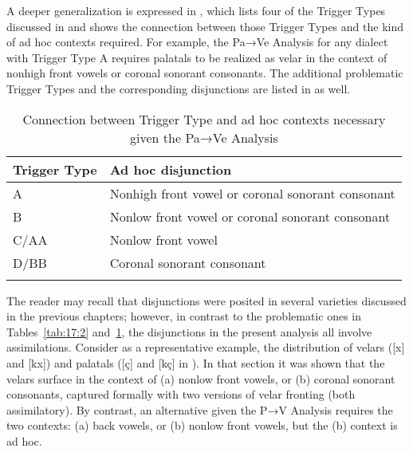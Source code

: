 A deeper generalization is expressed in , which lists four of the Trigger Types discussed in  and shows the connection between those Trigger Types and the kind of ad hoc contexts required. For example, the Pa→Ve Analysis for any dialect with Trigger Type A requires palatals to be realized as velar in the context of nonhigh front vowels or coronal sonorant consonants. The additional problematic Trigger Types and the corresponding disjunctions are listed in  as well.

\begin{table}
\caption{Connection between Trigger Type and ad hoc contexts necessary given the Pa→Ve Analysis\label{tab:17:3}}
\begin{tabular}{ll}
\lsptoprule
Trigger Type & Ad hoc disjunction\\\midrule
A & Nonhigh front vowel or coronal sonorant consonant\\
B & Nonlow front vowel or coronal sonorant consonant\\
C/AA & Nonlow front vowel\\
D/BB & Coronal sonorant consonant\\
\lspbottomrule
\end{tabular}
\end{table}

The reader may recall that disjunctions were posited in several varieties discussed in the previous chapters; however, in contrast to the problematic ones in Tables~\ref{tab:17:2} and~\ref{tab:17:3}, the disjunctions in the present analysis all involve assimilations. Consider as a representative example, the distribution of velars ([x] and [kx]) and palatals ([ç] and [kç] in  ). In that section it was shown that the velars surface in the context of (a) nonlow front vowels, or (b) coronal sonorant consonants, captured formally with two versions of velar fronting (both assimilatory). By contrast, an alternative given the P→V Analysis requires the two contexts: (a) back vowels, or (b) nonlow front vowels, but the (b) context is ad hoc.

